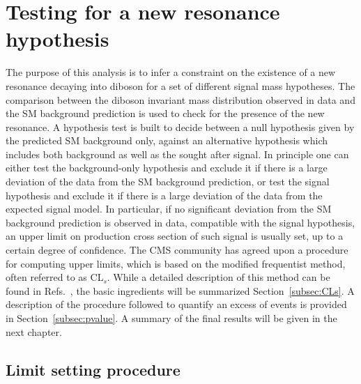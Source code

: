 \section{Testing for a new resonance hypothesis}\label{sec:stat}

The purpose of this analysis is to infer a constraint on the existence of a new resonance decaying into diboson for a set of different signal mass hypotheses.
The comparison between the diboson invariant mass distribution observed in data and the SM background prediction is used to check for the presence of the new resonance.
A hypothesis test is built to decide between a null hypothesis given by the predicted SM background only, against an alternative hypothesis which includes both background as well as the sought after signal.
In principle one can either test the background-only hypothesis and exclude it if there is a large deviation of the data from the SM background prediction,
or test the signal hypothesis and exclude it if there is a large deviation of the data from the expected signal model.
In particular, if no significant deviation from the SM background prediction is observed in data, compatible with the signal hypothesis, an upper limit on 
production cross section of such signal is usually set, up to a certain degree of confidence.
The CMS community has agreed upon a procedure for computing upper limits, which is based on the modified frequentist method, often referred to as $\mathrm{CL}_s$.
While a detailed description of this method can be found in Refs.~\cite{CLs1,Junk:1999kv}, the basic ingredients will be summarized Section~\ref{subsec:CLs}.
A description of the procedure followed to quantify an excess of events is provided in Section~\ref{subsec:pvalue}. A summary of the final results will be given in the next chapter.

\subsection{Limit setting procedure}~\label{subsec:CLs}

